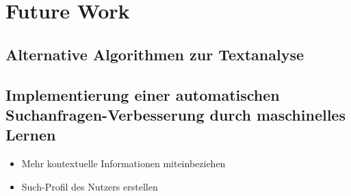 \section{Future Work}
\label{sec:futureWork}
 \subsection{Alternative Algorithmen zur Textanalyse}
 \subsection{Implementierung einer automatischen Suchanfragen-Verbesserung durch maschinelles Lernen}
 	\begin{itemize}
 		\item Mehr kontextuelle Informationen miteinbeziehen
 		\item Such-Profil des Nutzers erstellen

 	\end{itemize}
